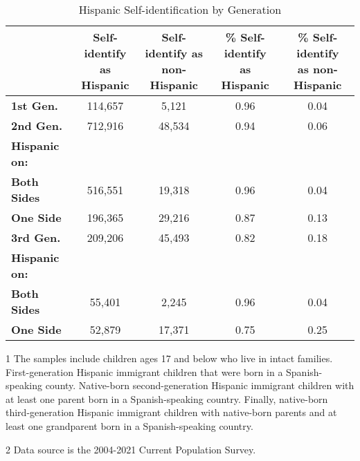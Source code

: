 \begin{table}[H]

\caption{Hispanic Self-identification by Generation \label{tab:hispbygen}}
\centering
\begin{threeparttable}
\begin{tabular}[t]{>{}lcccc}
\toprule
  & \specialcell{Self-identify \\ as Hispanic} & \specialcell{Self-identify as \\ non-Hispanic} & \specialcell{\% Self-identify \\ as Hispanic} & \specialcell{\% Self-identify \\ as non-Hispanic}\\
\midrule
\textbf{1st Gen.} & 114,657 & 5,121 & 0.96 & 0.04\\
\textbf{2nd Gen.} & 712,916 & 48,534 & 0.94 & 0.06\\
\hspace{1em}\textbf{Hispanic on:} &  &  &  \vphantom{1} & \\
\hspace{1em}\hspace{1em}\textbf{Both Sides} & 516,551 & 19,318 & 0.96 & 0.04\\
\hspace{1em}\hspace{1em}\textbf{One Side} & 196,365 & 29,216 & 0.87 & 0.13\\
\addlinespace
\textbf{3rd Gen.} & 209,206 & 45,493 & 0.82 & 0.18\\
\hspace{1em}\textbf{Hispanic on:} &  &  &  & \\
\hspace{1em}\hspace{1em}\textbf{Both Sides} & 55,401 & 2,245 & 0.96 & 0.04\\
\hspace{1em}\hspace{1em}\textbf{One Side} & 52,879 & 17,371 & 0.75 & 0.25\\
\bottomrule
\end{tabular}
\begin{tablenotes}
\item[1] The samples include children ages 17 and below who live in intact families. First-generation Hispanic immigrant children that were born in a Spanish-speaking county. Native-born second-generation Hispanic immigrant children with at least one parent born in a Spanish-speaking country. Finally, native-born third-generation Hispanic immigrant children with native-born parents and at least one grandparent born in a Spanish-speaking country.
\item[2] Data source is the 2004-2021 Current Population Survey.
\end{tablenotes}
\end{threeparttable}
\end{table}
